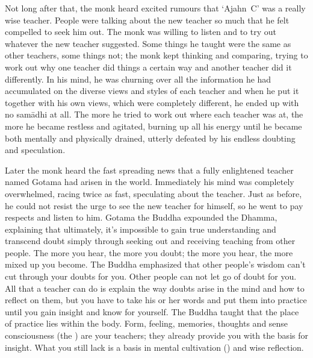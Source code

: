 Not long after that, the monk heard excited rumours that `Ajahn~C' was a really wise teacher. People were talking about the new teacher so much that he felt compelled to seek him out. The monk was willing to listen and to try out whatever the new teacher suggested. Some things he taught were the same as other teachers, some things not; the monk kept thinking and comparing, trying to work out why one teacher did things a certain way and another teacher did it differently. In his mind, he was churning over all the information he had accumulated on the diverse views and styles of each teacher and when he put it together with his own views, which were completely different, he ended up with no sam\=adhi at all. The more he tried to work out where each teacher was at, the more he became restless and agitated, burning up all his energy until he became both mentally and physically drained, utterly defeated by his endless doubting and speculation.

Later the monk heard the fast spreading news that a fully enlightened teacher named Gotama had arisen in the world. Immediately his mind was completely overwhelmed, racing twice as fast, speculating about the teacher. Just as before, he could not resist the urge to see the new teacher for himself, so he went to pay respects and listen to him. Gotama the Buddha expounded the Dhamma, explaining that ultimately, it's impossible to gain true understanding and transcend doubt simply through seeking out and receiving teaching from other people. The more you hear, the more you doubt; the more you hear, the more mixed up you become. The Buddha emphasized that other people's wisdom can't cut through your doubts for you. Other people can not let go of doubt for you. All that a teacher can do is explain the way doubts arise in the mind and how to reflect on them, but you have to take his or her words and put them into practice until you gain insight and know for yourself. The Buddha taught that the place of practice lies within the body. Form, feeling, memories, thoughts and sense consciousness (the ) are your teachers; they already provide you with the basis for insight. What you still lack is a basis in mental cultivation () and wise reflection.

